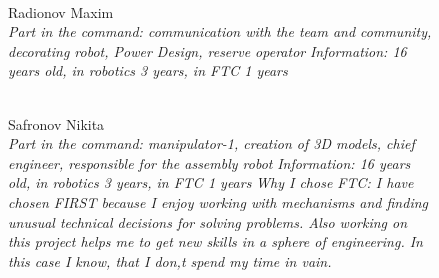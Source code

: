 \begin{figure}[H]
\begin{minipage}[h]{0.47\linewidth}
		\\
		Radionov Maxim\\
		\emph{Part in the command: communication with the team and community, decorating robot, Power Design, reserve operator  }
		\emph{Information: 16 years old, in robotics 3 years, in FTC 1 years}
	\end{minipage}
	\center  
	\center  
	\vfill 
	\begin{minipage}[h]{0.47\linewidth}
		\\
		Safronov Nikita\\
		\emph{Part in the command: manipulator-1,  creation of 3D models, chief engineer, responsible for the assembly robot}
		\emph{Information: 16 years old, in robotics 3 years, in FTC 1 years} 
		\emph{Why I chose FTC: I have chosen FIRST because I enjoy working with mechanisms and finding unusual technical decisions for solving problems. Also working on this project helps me to get new skills in a sphere of engineering. In this case I know, that I don,t spend my time in vain.}			

\end{minipage}
\end{figure}
